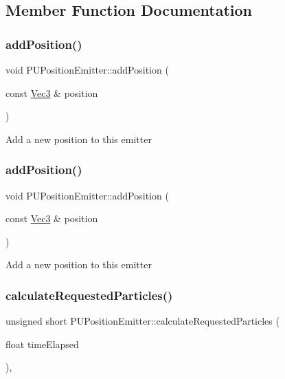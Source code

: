 \subsection{Member Function Documentation}
\mbox{\label{classPUPositionEmitter_a903a6a3c8124f015c880ffe22a89e0e7}} 
\subsubsection{\texorpdfstring{add\+Position()}{addPosition()}\hspace{0.1cm}{\footnotesize\ttfamily [1/2]}}
{\footnotesize\ttfamily void P\+U\+Position\+Emitter\+::add\+Position (\begin{DoxyParamCaption}\item[{const \hyperlink{classVec3}{Vec3} \&}]{position }\end{DoxyParamCaption})}

Add a new position to this emitter \mbox{\label{classPUPositionEmitter_a903a6a3c8124f015c880ffe22a89e0e7}} 
\subsubsection{\texorpdfstring{add\+Position()}{addPosition()}\hspace{0.1cm}{\footnotesize\ttfamily [2/2]}}
{\footnotesize\ttfamily void P\+U\+Position\+Emitter\+::add\+Position (\begin{DoxyParamCaption}\item[{const \hyperlink{classVec3}{Vec3} \&}]{position }\end{DoxyParamCaption})}

Add a new position to this emitter \mbox{\label{classPUPositionEmitter_a1817d8fb364e86fa04805c35a9c07961}} 
\subsubsection{\texorpdfstring{calculate\+Requested\+Particles()}{calculateRequestedParticles()}\hspace{0.1cm}{\footnotesize\ttfamily [1/2]}}
{\footnotesize\ttfamily unsigned short P\+U\+Position\+Emitter\+::calculate\+Requested\+Particles (\begin{DoxyParamCaption}\item[{float}]{time\+Elapsed }\end{DoxyParamCaption})\hspace{0.3cm}{\ttfamily [override]}, {\ttfamily [virtual]}}


